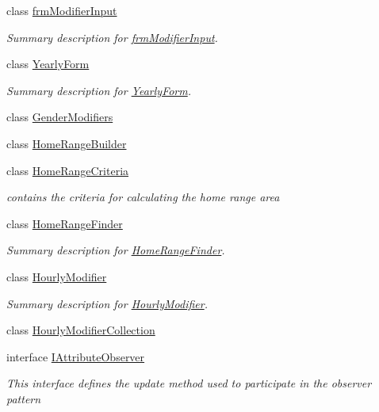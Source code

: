 \begin{DoxyCompactItemize}
class \hyperlink{class_p_a_z___dispersal_1_1frm_modifier_input}{frm\-Modifier\-Input}
\begin{DoxyCompactList}\small\item\em Summary description for \hyperlink{class_p_a_z___dispersal_1_1frm_modifier_input}{frm\-Modifier\-Input}. \end{DoxyCompactList}\item 
class \hyperlink{class_p_a_z___dispersal_1_1_yearly_form}{Yearly\-Form}
\begin{DoxyCompactList}\small\item\em Summary description for \hyperlink{class_p_a_z___dispersal_1_1_yearly_form}{Yearly\-Form}. \end{DoxyCompactList}\item 
class \hyperlink{class_p_a_z___dispersal_1_1_gender_modifiers}{Gender\-Modifiers}
\item 
class \hyperlink{class_p_a_z___dispersal_1_1_home_range_builder}{Home\-Range\-Builder}
\item 
class \hyperlink{class_p_a_z___dispersal_1_1_home_range_criteria}{Home\-Range\-Criteria}
\begin{DoxyCompactList}\small\item\em contains the criteria for calculating the home range area \end{DoxyCompactList}\item 
class \hyperlink{class_p_a_z___dispersal_1_1_home_range_finder}{Home\-Range\-Finder}
\begin{DoxyCompactList}\small\item\em Summary description for \hyperlink{class_p_a_z___dispersal_1_1_home_range_finder}{Home\-Range\-Finder}. \end{DoxyCompactList}\item 
class \hyperlink{class_p_a_z___dispersal_1_1_hourly_modifier}{Hourly\-Modifier}
\begin{DoxyCompactList}\small\item\em Summary description for \hyperlink{class_p_a_z___dispersal_1_1_hourly_modifier}{Hourly\-Modifier}. \end{DoxyCompactList}\item 
class \hyperlink{class_p_a_z___dispersal_1_1_hourly_modifier_collection}{Hourly\-Modifier\-Collection}
\item 
interface \hyperlink{interface_p_a_z___dispersal_1_1_i_attribute_observer}{I\-Attribute\-Observer}
\begin{DoxyCompactList}\small\item\em This interface defines the update method used to participate in the observer pattern \end{DoxyCompactList}\item 

\end{DoxyCompactItemize}
